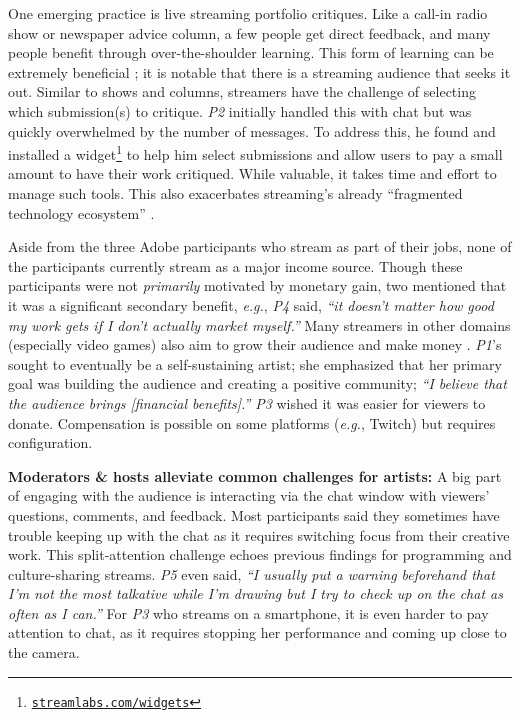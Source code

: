 One emerging practice is live streaming portfolio critiques. Like a call-in radio show or newspaper advice column, a few people get direct feedback, and many people benefit through over-the-shoulder learning. This form of learning can be extremely beneficial \cite{Lopez2010}; it is notable that there is a streaming audience that seeks it out. Similar to shows and columns, streamers have the challenge of selecting which submission(s) to critique. \textit{P2} initially handled this with chat but was quickly overwhelmed by the number of messages. To address this, he found and installed a widget\footnote{\href{https://streamlabs.com/widgets}{\nolinkurl{streamlabs.com/widgets}}} to help him select submissions and allow users to pay a small amount to have their work critiqued. While valuable, it takes time and effort to manage such tools. This also exacerbates streaming's already ``fragmented technology ecosystem'' \cite{Lu2019}.

Aside from the three Adobe participants who stream as part of their jobs, none of the participants currently stream as a major income source. Though these participants were not \textit{primarily} motivated by monetary gain, two mentioned that it was a significant secondary benefit, \textit{e.g.}, \textit{P4} said, \textit{``it doesn't matter how good my work gets if I don't actually market myself.''} Many streamers in other domains (especially video games) also aim to grow their audience and make money \cite{Pellicone2017}. \textit{P1}'s sought to eventually be a self-sustaining artist; she emphasized that her primary goal was building the audience and creating a positive community; \textit{``I believe that the audience brings [financial benefits].''} \textit{P3} wished it was easier for viewers to donate. Compensation is possible on some platforms (\textit{e.g.}, Twitch) but requires configuration.

\textbf{Moderators \& hosts alleviate common challenges for artists:}
A big part of engaging with the audience is interacting via the chat window with viewers' questions, comments, and feedback. 
Most participants said they sometimes have trouble keeping up with the chat as it requires switching focus from their creative work. This split-attention challenge echoes previous findings for programming \cite{Faas2018} and culture-sharing \cite{Lu2019} streams.
\textit{P5} even said, \textit{``I usually put a warning beforehand that I'm not the most talkative while I'm drawing but I try to check up on the chat as often as I can.''} For \textit{P3} who streams on  a smartphone, it is even harder to pay attention to chat, as it requires stopping her performance and coming up close to the camera.

